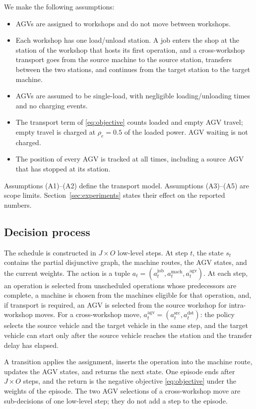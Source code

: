 We make the following assumptions:
\begin{itemize}
\item[(A1)] AGVs are assigned to workshops and do not move between
workshops.
\item[(A2)] Each workshop has one load/unload station. A job enters the
shop at the station of the workshop that hosts its first operation, and
a cross-workshop transport goes from the source machine to the source
station, transfers between the two stations, and continues from the
target station to the target machine.
\item[(A3)] AGVs are assumed to be single-load, with negligible loading/unloading times and no charging events.
\item[(A4)] The transport term of \eqref{eq:objective} counts loaded and
empty AGV travel; empty travel is charged at $\rho_e=0.5$ of the loaded
power. AGV waiting is not charged.
\item[(A5)] The position of every AGV is tracked at all times, including
a source AGV that has stopped at its station.
\end{itemize}

Assumptions (A1)--(A2) define the transport model. Assumptions (A3)--(A5)
are scope limits. Section~\ref{sec:experiments} states their effect on the
reported numbers.

\subsection{Decision process}

The schedule is constructed in $J \times O$ low-level steps. At step $t$, the state
$s_t$ contains the partial disjunctive graph, the machine routes, the AGV
states, and the current weights. The action is a tuple
$a_t=(a^{\mathrm{job}}_t,a^{\mathrm{mach}}_t,a^{\mathrm{agv}}_t)$.
At each step, an operation is selected from unscheduled operations whose predecessors are complete,
a machine is chosen from the machines eligible for that operation, and, if transport is required,
an AGV is selected from the source workshop for intra-workshop moves. For a cross-workshop move,
$a^{\mathrm{agv}}_t=(a^{\mathrm{src}}_t,a^{\mathrm{dst}}_t)$: the policy selects the source
vehicle and the target vehicle in the same step, and the target vehicle can start only after the
source vehicle reaches the station and the transfer delay has elapsed.

A transition applies the assignment, inserts the operation into the machine
route, updates the AGV states, and returns the next state. One episode ends
after $J \times O$ steps, and the return is the negative objective
\eqref{eq:objective} under the weights of the episode. The two AGV selections of
a cross-workshop move are sub-decisions of one low-level step; they do not add a
step to the episode.

